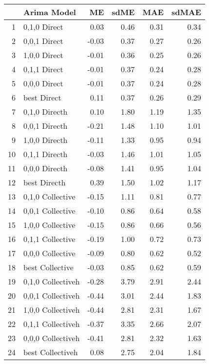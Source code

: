 \begin{table}[ht]
\centering
\begin{tabular}{rlrrrr}
  \hline
 & Arima Model & ME & sdME & MAE & sdMAE \\ 
  \hline
1 & 0,1,0 Direct & 0.03 & 0.46 & 0.31 & 0.34 \\ 
  2 & 0,0,1 Direct & -0.03 & 0.37 & 0.27 & 0.26 \\ 
  3 & 1,0,0 Direct & -0.01 & 0.36 & 0.25 & 0.26 \\ 
  4 & 0,1,1 Direct & -0.01 & 0.37 & 0.24 & 0.28 \\ 
  5 & 0,0,0 Direct & -0.01 & 0.37 & 0.24 & 0.28 \\ 
  6 & best Direct & 0.11 & 0.37 & 0.26 & 0.29 \\ 
  7 & 0,1,0 Directh & 0.10 & 1.80 & 1.19 & 1.35 \\ 
  8 & 0,0,1 Directh & -0.21 & 1.48 & 1.10 & 1.01 \\ 
  9 & 1,0,0 Directh & -0.11 & 1.33 & 0.95 & 0.94 \\ 
  10 & 0,1,1 Directh & -0.03 & 1.46 & 1.01 & 1.05 \\ 
  11 & 0,0,0 Directh & -0.08 & 1.41 & 0.95 & 1.04 \\ 
  12 & best Directh & 0.39 & 1.50 & 1.02 & 1.17 \\ 
  13 & 0,1,0 Collective & -0.15 & 1.11 & 0.81 & 0.77 \\ 
  14 & 0,0,1 Collective & -0.10 & 0.86 & 0.64 & 0.58 \\ 
  15 & 1,0,0 Collective & -0.15 & 0.86 & 0.66 & 0.56 \\ 
  16 & 0,1,1 Collective & -0.19 & 1.00 & 0.72 & 0.73 \\ 
  17 & 0,0,0 Collective & -0.09 & 0.80 & 0.62 & 0.52 \\ 
  18 & best Collective & -0.03 & 0.85 & 0.62 & 0.59 \\ 
  19 & 0,1,0 Collectiveh & -0.28 & 3.79 & 2.91 & 2.44 \\ 
  20 & 0,0,1 Collectiveh & -0.44 & 3.01 & 2.44 & 1.83 \\ 
  21 & 1,0,0 Collectiveh & -0.44 & 2.81 & 2.31 & 1.67 \\ 
  22 & 0,1,1 Collectiveh & -0.37 & 3.35 & 2.66 & 2.07 \\ 
  23 & 0,0,0 Collectiveh & -0.41 & 2.81 & 2.32 & 1.63 \\ 
  24 & best Collectiveh & 0.08 & 2.75 & 2.04 & 1.84 \\ 
   \hline
\end{tabular}
\end{table}

